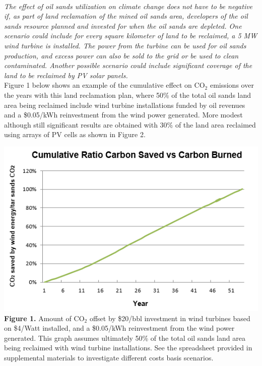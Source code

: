 \documentclass[12pt]{article}
\begin{document}
 \\

\emph{The effect of oil sands utilization on climate change does not have to be negative if, as part of land reclamation of the mined oil sands area, developers of the oil sands resource planned and invested for when the oil sands are depleted. One scenario could include for every square kilometer of land to be reclaimed, a 5 MW wind turbine is installed. The power from the turbine can be used for oil sands production, and excess power can also be sold to the grid or be used to clean contaminated. Another possible scenario could include significant coverage of the land to be reclaimed by PV solar panels. } \\
  
Figure 1 below shows an example of the cumulative effect on CO$_2$ emissions over the years with this land reclamation plan, where 50\% of the total oil sands land area being reclaimed include wind turbine installations funded by oil revenues and a \$0.05/kWh reinvestment from the wind power generated. More modest although still significant results are obtained with 30\% of the land area reclaimed using arrays of PV cells as shown in Figure 2. \\

\begin{center}
\includegraphics{g1.png}
{\bf Figure 1.} Amount of CO$_2$ offset by \$20/bbl investment in wind turbines based on \$4/Watt installed, and a \$0.05/kWh reinvestment from the wind power generated. This graph assumes ultimately 50\% of the total oil sands land area being reclaimed with wind turbine installations. See the spreadsheet provided in supplemental materials to investigate different costs basis scenarios.
\end{center}
\end{document}
